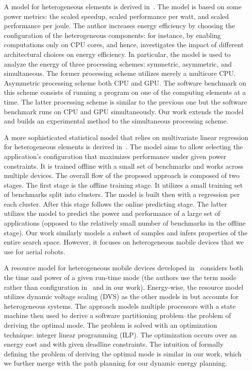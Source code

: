 A model for heterogeneous elements is derived in~\citep{marowka2017energy}. The model is based on some power metrics: the scaled speedup, scaled performance per watt, and scaled performance per joule. The author increases energy efficiency by choosing the configuration of the heterogeneous components: for instance, by enabling computations only on CPU cores, and hence, investigates the impact of different architectural choices on energy efficiency. In particular, the model is used to analyze the energy of three processing schemes: symmetric, asymmetric, and simultaneous. The former processing scheme utilizes merely a multicore CPU. Asymmetric processing scheme both CPU and GPU. The software benchmark on this scheme consists of running a program on one of the computing elements at a time. The latter processing scheme is similar to the previous one but the software benchmark runs on CPU and GPU simultaneously. Our work extends the model and builds an experimental method to the simultaneous processing scheme.

A more sophisticated statistical model that relies on multivariate linear regression for heterogeneous elements is derived in~\citep{bailey2014adaptive}. The model aims to allow selecting the application's configuration that maximizes performance under given power constraints. It is trained offline with a small set of benchmarks and works across multiple devices. The overall flow of the proposed approach is composed of two stages. The first stage is the offline training stage. It utilizes a small training set of benchmarks split into clusters. The model is built then with a regression per each cluster. After this stage follows the online predicting stage. The latter utilizes the model to predict the power and performance of a large set of applications (opposed to the relatively small number of benchmarks in the offline stage). Our work similarly models a subset of samples and infers properties of the entire search space. However, it focuses on heterogeneous mobile devices that we use for aerial robots.

A resource model for heterogeneous mobile devices developed in~\citep{goraczko2008energy} considers both the time and power of a given run-time mode (the authors use the term mode rather than configuration in~\citep{marowka2017energy,bailey2014adaptive} and in our work). Energy-wise, the resource model utilizes dynamic voltage scaling (DVS) as the other models in  but accounts for heterogeneous systems. The approach models multiple processors with a state machine then used to derive a software partitioning problem--the problem of deriving the optimal mode. The problem is solved with an optimization technique: integer linear programming (ILP). The optimization occurs over an energy cost and with given deadline constraints. The intuition of formally defining the problem of deriving the optimal mode is similar in our work, which we further merge with the path planning for our dynamic energy planning.

